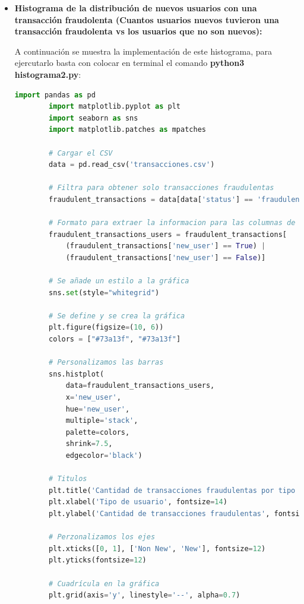 \documentclass{article}
\begin{document}
\begin{itemize}
    \item \textbf{Histograma de la distribución de nuevos usuarios con una transacción fraudolenta (Cuantos usuarios nuevos tuvieron una transacción fraudolenta vs los usuarios que no son nuevos):}

    A continuación se muestra la implementación de este histograma, para ejercutarlo basta con colocar en terminal el comando \textbf{python3 histograma2.py}:

    \begin{lstlisting}[language=Python, caption=Implementación DES(Data Encryption Standard)]
        import pandas as pd
        import matplotlib.pyplot as plt
        import seaborn as sns
        import matplotlib.patches as mpatches
        
        # Cargar el CSV
        data = pd.read_csv('transacciones.csv')
        
        # Filtra para obtener solo transacciones fraudulentas
        fraudulent_transactions = data[data['status'] == 'fraudulent']
        
        # Formato para extraer la informacion para las columnas de los usuarios no nuevos y nuevos
        fraudulent_transactions_users = fraudulent_transactions[
            (fraudulent_transactions['new_user'] == True) | 
            (fraudulent_transactions['new_user'] == False)]
        
        # Se añade un estilo a la gráfica
        sns.set(style="whitegrid")
        
        # Se define y se crea la gráfica
        plt.figure(figsize=(10, 6)) 
        colors = ["#73a13f", "#73a13f"]
        
        # Personalizamos las barras
        sns.histplot(
            data=fraudulent_transactions_users, 
            x='new_user', 
            hue='new_user',  
            multiple='stack', 
            palette=colors,
            shrink=7.5,  
            edgecolor='black')
        
        # Titulos
        plt.title('Cantidad de transacciones fraudulentas por tipo de usuario', fontsize=16, fontweight='bold')
        plt.xlabel('Tipo de usuario', fontsize=14)
        plt.ylabel('Cantidad de transacciones fraudulentas', fontsize=14)
        
        # Perzonalizamos los ejes
        plt.xticks([0, 1], ['Non New', 'New'], fontsize=12) 
        plt.yticks(fontsize=12)
        
        # Cuadrícula en la gráfica 
        plt.grid(axis='y', linestyle='--', alpha=0.7)
        

\end{lstlisting}
\end{itemize}
\end{document}
